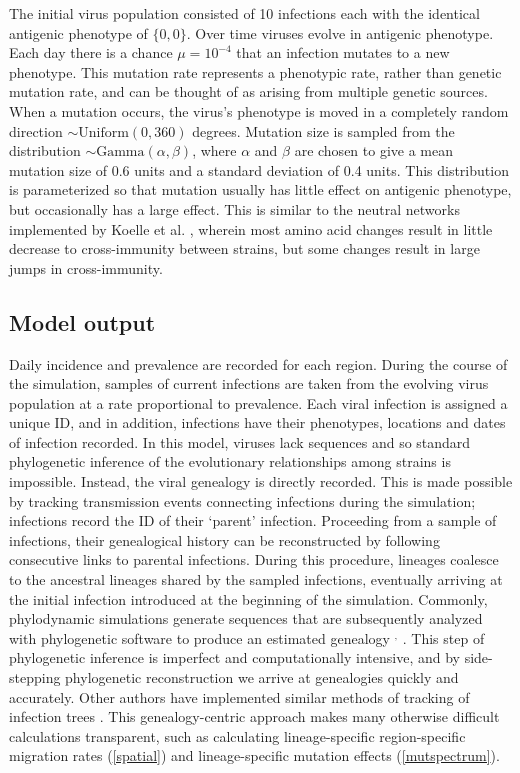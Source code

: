 The initial virus population consisted of 10 infections each with the identical antigenic phenotype of $\{0,0\}$.  Over time viruses evolve in antigenic phenotype.  Each day there is a chance $\mu = 10^{-4}$ that an infection mutates to a new phenotype.  This mutation rate represents a phenotypic rate, rather than genetic mutation rate, and can be thought of as arising from multiple genetic sources.  When a mutation occurs, the virus's phenotype is moved in a completely random direction $\sim \textrm{Uniform}(0,360)$ degrees. Mutation size is sampled from the distribution $\sim \textrm{Gamma}(\alpha,\beta)$, where $\alpha$ and $\beta$ are chosen to give a mean mutation size of 0.6 units and a standard deviation of 0.4 units.  This distribution is parameterized so that mutation usually has little effect on antigenic phenotype, but occasionally has a large effect.  This is similar to the neutral networks implemented by Koelle et al. \cite{Koelle06}, wherein most amino acid changes result in little decrease to cross-immunity between strains, but some changes result in large jumps in cross-immunity.

\subsection*{Model output}

Daily incidence and prevalence are recorded for each region.  During the course of the simulation, samples of current infections are taken from the evolving virus population at a rate proportional to prevalence.  Each viral infection is assigned a unique ID, and in addition, infections have their phenotypes, locations and dates of infection recorded.  In this model, viruses lack sequences and so standard phylogenetic inference of the evolutionary relationships among strains is impossible.  Instead, the viral genealogy is directly recorded.  This is made possible by tracking transmission events connecting infections during the simulation; infections record the ID of their `parent' infection.  Proceeding from a sample of infections, their genealogical history can be reconstructed by following consecutive links to parental infections.  During this procedure, lineages coalesce to the ancestral lineages shared by the sampled infections, eventually arriving at the initial infection introduced at the beginning of the simulation.  Commonly, phylodynamic simulations generate sequences that are subsequently analyzed with phylogenetic software to produce an estimated genealogy \cite{Ferguson03,Koelle06}$^,$ .  This step of phylogenetic inference is imperfect and computationally intensive, and by side-stepping phylogenetic reconstruction we arrive at genealogies quickly and accurately.  Other authors have implemented similar methods of tracking of infection trees .  This genealogy-centric approach makes many otherwise difficult calculations transparent, such as calculating lineage-specific region-specific migration rates (\ref{spatial}) and lineage-specific mutation effects (\ref{mutspectrum}).

